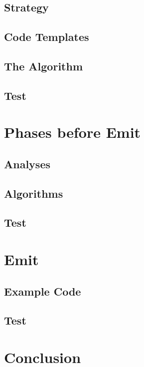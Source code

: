 \documentclass[a4paper,10pt,titlepage]{report}
\begin{document}
\subsection{Strategy}

\subsection{Code Templates}

\subsection{The Algorithm}

\subsection{Test}

\section{Phases before Emit}

\subsection{Analyses}

\subsection{Algorithms}

\subsection{Test}

\section{Emit}

\subsection{Example Code}

\subsection{Test}

\section{Conclusion}
\end{document}
